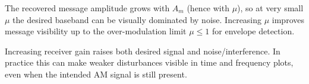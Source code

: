 The recovered message amplitude grows with $A_m$ (hence with $\mu$), so at very small $\mu$ the desired baseband can be visually dominated by noise. Increasing $\mu$ improves message visibility up to the over-modulation limit $\mu\le 1$ for envelope detection.

Increasing receiver gain raises both desired signal and noise/interference. In practice this can make weaker disturbances visible in time and frequency plots, even when the intended AM signal is still present.

